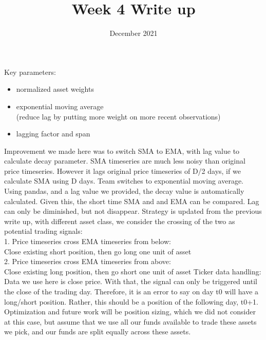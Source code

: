 \documentclass{article}
\title {Week 4 Write up}
\date{December 2021}
\begin{document}
\maketitle
\setlength{\parindent}{0pt}
Key parameters:
\begin{itemize}

\item normalized asset weights
\item exponential moving average 
\\(reduce lag by putting more weight on more recent observations) 
\item lagging factor and span
\end{itemize}
\medbreak
Improvement we made here was to switch SMA to EMA, with lag value to calculate decay parameter.
SMA timeseries are much less noisy than original price timeseries. However it lags original price timeseries of D/2 days, if we calculate SMA using D days. Team switches to exponential moving average. Using pandas, and a lag value we provided, the decay value is automatically calculated. 
Given this, the short time SMA and and EMA can be compared. Lag can only be diminished, but not disappear. 
\medbreak
Strategy is updated from the previous write up, with different asset class, we consider the crossing of the two as potential trading signals:
\\1. Price timeseries cross EMA timeseries from below: 
\\Close existing short position, then go long one unit of asset
\\2. Price timeseries cross EMA timeseries from above: 
\\Close existing long position, then go short one unit of asset
\medbreak
Ticker data handling:
\\Data we use here is close price. With that, the signal can only be triggered until the close of the trading day. Therefore, it is an error to say on day t0 will have a long/short position. Rather, this should be a position of the following day, t0+1. 
\medbreak
Optimization and future work will be position sizing, which we did not consider at this case, but assume that we use all our funds available to trade these assets we pick, and our funds are split equally across these assets. 
\end{document}
